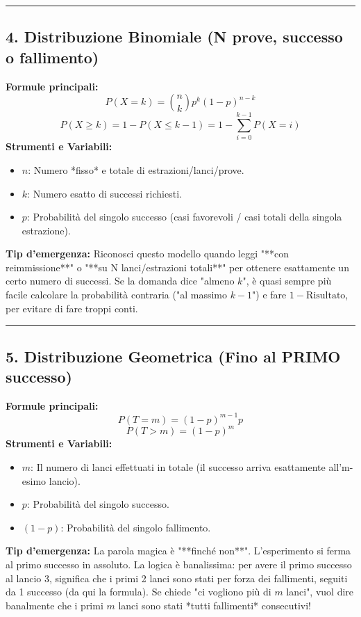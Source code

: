 \documentclass[12pt, a4paper]{article}
\begin{document}
\vspace{0.3cm}\hrule\vspace{0.3cm}

\subsection*{4. Distribuzione Binomiale (N prove, successo o fallimento)}
\textbf{Formule principali:}
$$ P(X=k) = \binom{n}{k} p^k (1-p)^{n-k} $$
$$ P(X \ge k) = 1 - P(X \le k-1) = 1 - \sum_{i=0}^{k-1} P(X=i) $$
\textbf{Strumenti e Variabili:}
\begin{itemize}
    \item $n$: Numero *fisso* e totale di estrazioni/lanci/prove.
    \item $k$: Numero esatto di successi richiesti.
    \item $p$: Probabilità del singolo successo (casi favorevoli / casi totali della singola estrazione).
\end{itemize}
\textbf{Tip d'emergenza:} Riconosci questo modello quando leggi "**con reimmissione**" o "**su N lanci/estrazioni totali**" per ottenere esattamente un certo numero di successi. Se la domanda dice "almeno $k$", è quasi sempre più facile calcolare la probabilità contraria ("al massimo $k-1$") e fare $1 - \text{Risultato}$, per evitare di fare troppi conti.

\vspace{0.3cm}\hrule\vspace{0.3cm}

\subsection*{5. Distribuzione Geometrica (Fino al PRIMO successo)}
\textbf{Formule principali:}
$$ P(T=m) = (1-p)^{m-1} p $$
$$ P(T > m) = (1-p)^m $$
\textbf{Strumenti e Variabili:}
\begin{itemize}
    \item $m$: Il numero di lanci effettuati in totale (il successo arriva esattamente all'm-esimo lancio).
    \item $p$: Probabilità del singolo successo.
    \item $(1-p)$: Probabilità del singolo fallimento.
\end{itemize}
\textbf{Tip d'emergenza:} La parola magica è "**finché non**". L'esperimento si ferma al primo successo in assoluto. La logica è banalissima: per avere il primo successo al lancio 3, significa che i primi 2 lanci sono stati per forza dei fallimenti, seguiti da 1 successo (da qui la formula). Se chiede "ci vogliono più di $m$ lanci", vuol dire banalmente che i primi $m$ lanci sono stati *tutti fallimenti* consecutivi!
\end{document}
